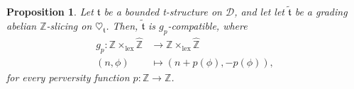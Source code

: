 \documentclass{article}
\newtheorem{prop}[thm]{Proposition}
\theoremstyle{definition}
\newcommand{\Z}{\mathbb{Z}}
\newcommand{\tee}{\mathfrak{t}}
\begin{document}
\begin{prop}\label{grad}
Let $\mathfrak{t}$ be a bounded t-structure on $\mathscr{D}$, and let let $\tilde{\tee}$ be a grading abelian $\mathbb{Z}$-slicing on $\heartsuit_{\mathfrak{t}}$. Then, $\tilde{\tee}$ is $g_p$-compatible, where 
\begin{align*}
g_p\colon \mathbb{Z} \times_{\mathrm{lex}} \hat{\mathbb{Z}}&\to \mathbb{Z} \times_{\mathrm{lex}} \hat{\mathbb{Z}}\\
(n,\phi)&\mapsto(n+p(\phi),-p(\phi)),
\end{align*}
for every  perversity function $p\colon \Z\to \Z$.
\end{prop}
\end{document}

